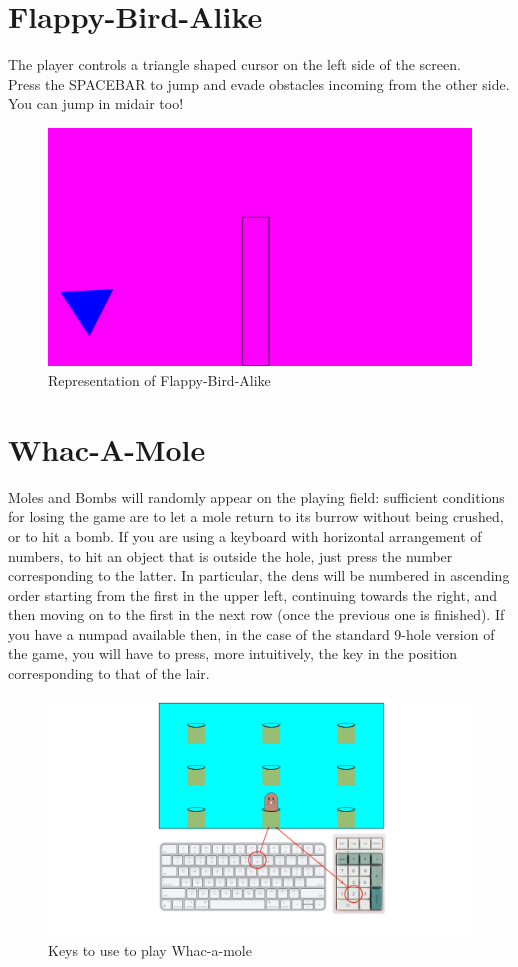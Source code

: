\documentclass[a4paper,12pt]{report}
\begin{document}
\section*{Flappy-Bird-Alike}
The player controls a triangle shaped cursor on the left side of the screen.\\
Press the SPACEBAR to jump and evade obstacles incoming from the other side. You can jump in midair too!
\begin{figure}[H]
	\centering{}
	\includegraphics[width=330pt]{res/Fba.png}
	\caption{Representation of Flappy-Bird-Alike}
\end{figure}
\section*{Whac-A-Mole}
Moles and Bombs will randomly appear on the playing field: sufficient conditions for losing the game are to let a mole return to its
burrow without being crushed, or to hit a bomb. If you are using a keyboard with horizontal arrangement of numbers, to hit an object that
is outside the hole, just press the number corresponding to the latter. In particular, the dens will be numbered in ascending order starting
from the first in the upper left, continuing towards the right, and then moving on to the first in the next row (once the previous one is
finished). If you have a numpad available then, in the case of the standard 9-hole version of the game, you will have to press, more intuitively,
the key in the position corresponding to that of the lair.
\begin{figure}[H]
	\centering{}
	\includegraphics[width=\textwidth]{res/InstructionsWam.pdf}
	\caption{Keys to use to play Whac-a-mole}
\end{figure}
\pagebreak
\end{document}
